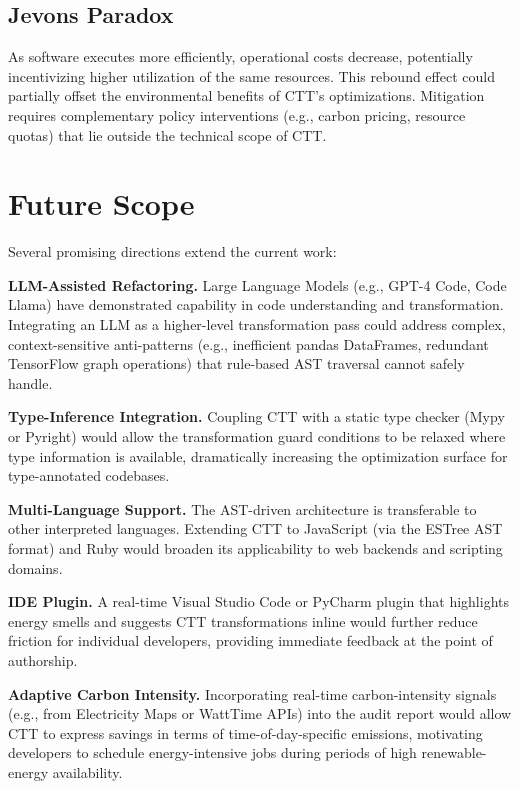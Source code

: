 \documentclass[conference]{IEEEtran}
\begin{document}
\subsection{Jevons Paradox}
As software executes more efficiently, operational costs decrease, potentially
incentivizing higher utilization of the same resources.  This rebound effect
could partially offset the environmental benefits of CTT's optimizations.
Mitigation requires complementary policy interventions (e.g., carbon pricing,
resource quotas) that lie outside the technical scope of CTT.

\section{Future Scope}

Several promising directions extend the current work:

\textbf{LLM-Assisted Refactoring.}  Large Language Models (e.g., GPT-4 Code,
Code Llama) have demonstrated capability in code understanding and
transformation.  Integrating an LLM as a higher-level transformation pass
could address complex, context-sensitive anti-patterns (e.g., inefficient
pandas DataFrames, redundant TensorFlow graph operations) that rule-based
AST traversal cannot safely handle.

\textbf{Type-Inference Integration.}  Coupling CTT with a static type
checker (Mypy or Pyright) would allow the transformation guard conditions to
be relaxed where type information is available, dramatically increasing the
optimization surface for type-annotated codebases.

\textbf{Multi-Language Support.}  The AST-driven architecture is transferable
to other interpreted languages.  Extending CTT to JavaScript (via the
ESTree AST format) and Ruby would broaden its applicability to web backends
and scripting domains.

\textbf{IDE Plugin.}  A real-time Visual Studio Code or PyCharm plugin that
highlights energy smells and suggests CTT transformations inline would
further reduce friction for individual developers, providing immediate
feedback at the point of authorship.

\textbf{Adaptive Carbon Intensity.}  Incorporating real-time carbon-intensity
signals (e.g., from Electricity Maps or WattTime APIs) into the audit report
would allow CTT to express savings in terms of time-of-day-specific emissions,
motivating developers to schedule energy-intensive jobs during periods of high
renewable-energy availability.
\end{document}

